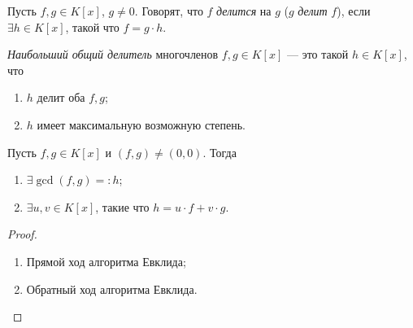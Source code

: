 \begin{comment}
    Доказательство дает алгоритм деления <<в столбик>>.
\end{comment}

\begin{definition}
    Пусть $f, g \in K[x]$, $g \neq 0$. Говорят, что $f$ \textit{делится} на $g$ ($g$ \textit{делит} $f$), если $\exists h \in K[x]$, такой что $f = g \cdot h$.
\end{definition}

\begin{definition}
    \textit{Наибольший общий делитель} многочленов $f, g \in K[x]$ --- это такой $h \in K[x]$, что
    \begin{enumerate}
    \item $h$ делит оба $f, g$;
    \item $h$ имеет максимальную возможную степень.
    \end{enumerate}
\end{definition}

\begin{theorem}
    Пусть $f, g \in K[x]$ и $(f, g) \neq (0, 0)$. Тогда
    \begin{enumerate}
        \item $\exists \gcd(f, g) =: h$;
        \item $\exists u, v \in K[x]$, такие что $h = u \cdot f + v \cdot g$.
    \end{enumerate}
\end{theorem}

\begin{proof}~
    \begin{enumerate}
    \item Прямой ход алгоритма Евклида;
    \item Обратный ход алгоритма Евклида.
        \qedhere
    \end{enumerate}
\end{proof}

\begin{comment}
    $\gcd(f, g)$ определен однозначно с точностью до пропорциональности.

    $2 = \gcd(2x^2, 2x + 1) = 1$.
\end{comment}
